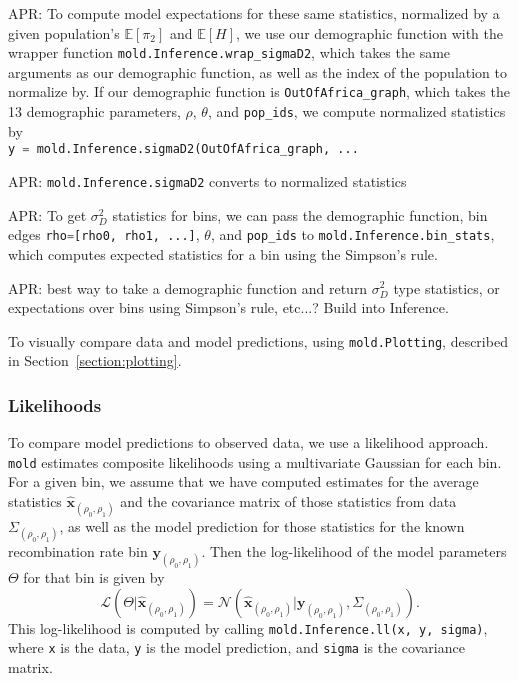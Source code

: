 \documentclass[10pt]{article}
\makeatletter
\newcommand{\comment}[1]{{\color{blue}APR: #1}}
\newcommand{\mold}{\texttt{mold}\xspace}
\newcommand{\py}[1]{\lstinline[breaklines=true,language=Python, showstringspaces=False]@#1@}
\newcommand{\E}{\mathbb{E}}
\makeatother
\begin{document}
\comment{
To compute model expectations for these same statistics, normalized by a given population's $\E[\pi_2]$ and $\E[H]$, we use our demographic function with the wrapper function \py{mold.Inference.wrap_sigmaD2}, which takes the same arguments as our demographic function, as well as the index of the population to normalize by.
If our demographic function is \py{OutOfAfrica_graph}, which takes the 13 demographic parameters, $\rho$, $\theta$, and \py{pop_ids}, we compute normalized statistics by \\
\py{y = mold.Inference.sigmaD2(OutOfAfrica_graph, ...}
}

\comment{\py{mold.Inference.sigmaD2} converts to normalized statistics}

\comment{To get $\sigma_D^2$ statistics for bins, we can pass the demographic function, bin edges \py{rho=[rho0, rho1, ...]}, $\theta$, and \py{pop_ids} to \py{mold.Inference.bin_stats}, which computes expected statistics for a bin using the Simpson's rule.}

\comment{best way to take a demographic function and return $\sigma_D^2$ type statistics, or expectations over bins using Simpson's rule, etc...? Build into Inference.}

To visually compare data and model predictions, using \py{mold.Plotting}, described in Section~\ref{section:plotting}.

\subsubsection{Likelihoods}

To compare model predictions to observed data, we use a likelihood approach.
\mold estimates composite likelihoods using a multivariate Gaussian for each bin.
For a given bin, we assume that we have computed estimates for the average statistics $\mathbf{\hat{x}}_{(\rho_0,\rho_1)}$ and the covariance matrix of those statistics from data $\Sigma_{(\rho_0,\rho_1)}$, as well as the model prediction for those statistics for the known recombination rate bin $\mathbf{y}_{(\rho_0,\rho_1)}$.
Then the log-likelihood of the model parameters $\Theta$ for that bin is given by
$$\mathcal{L}(\Theta | \mathbf{\hat{x}}_{(\rho_0,\rho_1)}) = \mathcal{N} \left( \mathbf{\hat{x}}_{(\rho_0,\rho_1)} | \mathbf{y}_{(\rho_0,\rho_1)}, \Sigma_{(\rho_0,\rho_1)} \right). $$
This log-likelihood is computed by calling \py{mold.Inference.ll(x, y, sigma)}, where \py{x} is the data, \py{y} is the model prediction, and \py{sigma} is the covariance matrix.
\end{document}
